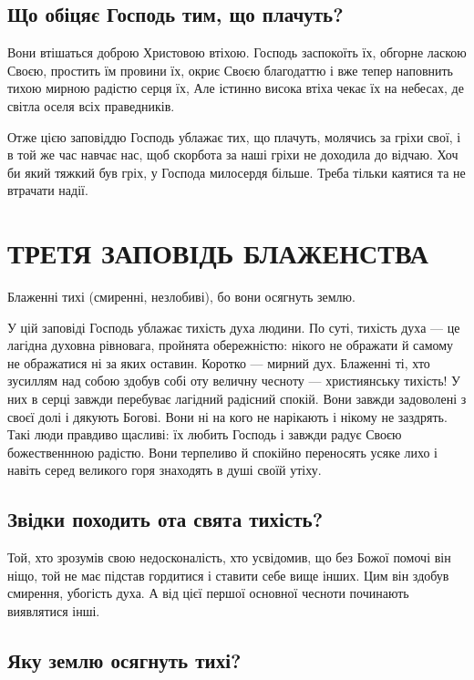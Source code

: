 \documentclass[main.tex]{subfiles}
\begin{document}
\subsection{Що обіцяє Господь тим, що плачуть?}

Вони втішаться доброю Христовою втіхою. Господь заспокоїть їх, обгорне ласкою Своєю, простить їм провини їх, окриє Своєю благодаттю і вже тепер наповнить тихою мирною радістю серця їх, Але істинно висока втіха чекає їх на небесах, де світла оселя всіх праведників.

Отже цією заповіддю Господь ублажає тих, що плачуть, молячись за гріхи свої, і в той же час навчає нас, щоб скорбота за наші гріхи не доходила до відчаю. Хоч би який тяжкий був гріх, у Господа милосердя більше. Треба тільки каятися та не втрачати надії.

\section{ТРЕТЯ ЗАПОВІДЬ БЛАЖЕНСТВА}

Блаженні тихі (смиренні, незлобиві), бо вони осягнуть землю.

У цій заповіді Господь ублажає тихість духа людини. По суті, тихість духа — це лагідна духовна рівновага, пройнята обережністю: нікого не ображати й самому не ображатися ні за яких оставин. Коротко — мирний дух. Блаженні ті, хто зусиллям над собою здобув собі оту величну чесноту — християнську тихість! У них в серці завжди перебуває лагідний радісний спокій. Вони завжди задоволені з своєї долі і дякують Богові. Вони ні на кого не нарікають і нікому не заздрять. Такі люди правдиво щасливі: їх любить Господь і завжди радує Своєю божественнною радістю. Вони терпеливо й спокійно переносять усяке лихо і навіть серед великого горя знаходять в душі своїй утіху.

\subsection{Звідки походить ота свята тихість?}

Той, хто зрозумів свою недосконалість, хто усвідомив, що без Божої помочі він ніщо, той не має підстав гордитися і ставити себе вище інших. Цим він здобув смирення, убогість духа. А від цієї першої основної чесноти починають виявлятися інші.

\subsection{Яку землю осягнуть тихі?}
\end{document}
